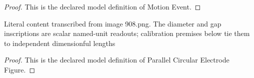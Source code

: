 \begin{proof}
  This is the declared model definition of Motion Event.
\end{proof}
\begin{definition}
  \label{def:physics:phyx-mini-0908:phyxminiproblems-problemphyxmini0908-parallelcircularelectrodefigure}
  Literal content transcribed from image 908.png. The diameter and gap inscriptions are scalar named-unit readouts; calibration premises below tie them to independent dimensionful lengths
\end{definition}
\begin{proof}
  This is the declared model definition of Parallel Circular Electrode Figure.
\end{proof}
